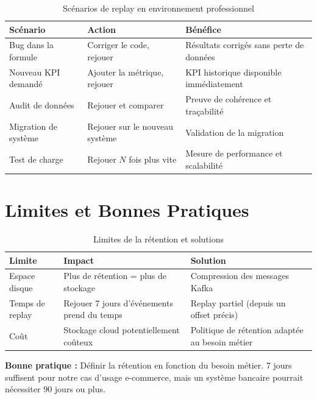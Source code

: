 \begin{table}[H]
\centering
\begin{tabularx}{\textwidth}{L{3.5cm} L{4cm} X}
\toprule
\textbf{\color{primarycolor}Scénario} &
\textbf{\color{primarycolor}Action} &
\textbf{\color{primarycolor}Bénéfice} \\
\midrule
Bug dans la formule & Corriger le code, rejouer & Résultats corrigés sans perte de données \\
\addlinespace[0.1cm]
Nouveau KPI demandé & Ajouter la métrique, rejouer & KPI historique disponible immédiatement \\
\addlinespace[0.1cm]
Audit de données & Rejouer et comparer & Preuve de cohérence et traçabilité \\
\addlinespace[0.1cm]
Migration de système & Rejouer sur le nouveau système & Validation de la migration \\
\addlinespace[0.1cm]
Test de charge & Rejouer $N$ fois plus vite & Mesure de performance et scalabilité \\
\bottomrule
\end{tabularx}
\caption{Scénarios de replay en environnement professionnel}
\end{table}

\section{Limites et Bonnes Pratiques}

\begin{table}[H]
\centering
\begin{tabularx}{\textwidth}{L{3cm} X X}
\toprule
\textbf{\color{primarycolor}Limite} &
\textbf{\color{primarycolor}Impact} &
\textbf{\color{primarycolor}Solution} \\
\midrule
Espace disque & Plus de rétention = plus de stockage & Compression des messages Kafka \\
\addlinespace[0.1cm]
Temps de replay & Rejouer 7 jours d'événements prend du temps & Replay partiel (depuis un offset précis) \\
\addlinespace[0.1cm]
Coût & Stockage cloud potentiellement coûteux & Politique de rétention adaptée au besoin métier \\
\bottomrule
\end{tabularx}
\caption{Limites de la rétention et solutions}
\end{table}

\begin{infobox}
    \textbf{Bonne pratique :} Définir la rétention en fonction du besoin métier. 7 jours suffisent pour notre cas d'usage e-commerce, mais un système bancaire pourrait nécessiter 90 jours ou plus.
\end{infobox}
